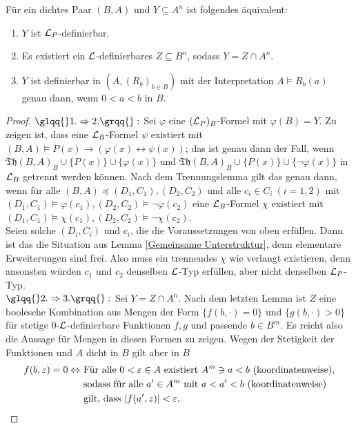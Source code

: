 \begin{theorem}\label{Definierbare Mengen}
	Für ein dichtes Paar $(B,A)$ und $Y\subseteq A^n$ ist folgendes äquivalent:
	\begin{enumerate}
		\item $Y$ ist $\mathcal{L}_P$-definierbar.
		\item Es existiert ein $\mathcal{L}$-definierbares $Z\subseteq B^n$, sodass $Y=Z\cap A^n$.
		\item $Y$ ist definierbar in $(A,(R_b)_{b\in B})$ mit der Interpretation $A\models R_b(a)$ genau dann, wenn $0<a<b$ in $B$.
	\end{enumerate}
\end{theorem}
\newpage
\begin{proof}
	$\glqq{}1.\Rightarrow 2.\grqq{}:$ Sei $\varphi$ eine $(\mathcal{L}_P)_B$-Formel mit $\varphi(B)=Y$. Zu zeigen ist, dass eine $\mathcal{L}_B$-Formel $\psi$ existiert mit $(B,A)\models P(x)\rightarrow(\varphi(x)\leftrightarrow\psi(x))$; das ist genau dann der Fall, wenn $\mathfrak{Th}(B,A)_B\cup\{P(x)\}\cup\{\varphi(x)\}$ und $\mathfrak{Th}(B,A)_B\cup\{P(x)\}\cup\{\neg\varphi(x)\}$ in $\mathcal{L}_B$ getrennt werden können. Nach dem Trennungslemma gilt das genau dann, wenn für alle $(B,A)\preceq(D_1,C_1),(D_2,C_2)$ und alle $c_i\in C_i\ (i=1,2)$ mit $(D_1,C_1)\models\varphi(c_1),(D_2,C_2)\models\neg\varphi(c_2)$ eine $\mathcal{L}_B$-Formel $\chi$ existiert mit $(D_1,C_1)\models\chi(c_1),(D_2,C_2)\models\neg\chi(c_2)$.\\
	Seien solche $(D_i,C_i)$ und $c_i$, die die Voraussetzungen von oben erfüllen. Dann ist das die Situation aus Lemma \ref{Gemeinsame Unterstruktur}, denn elementare Erweiterungen sind frei. Also muss ein trennendes $\chi$ wie verlangt existieren, denn ansonsten würden $c_1$ und $c_2$ denselben $\mathcal{L}$-Typ erfüllen, aber nicht denselben $\mathcal{L}_P$-Typ.\\
	$\glqq{}2.\Rightarrow 3.\grqq{}:$ Sei $Y=Z\cap A^n$. Nach dem letzten Lemma ist $Z$ eine boolesche Kombination aus Mengen der Form $\{f(b,\cdot)=0\}$ und $\{g(b,\cdot)>0\}$ für stetige 0-$\mathcal{L}$-definierbare Funktionen $f,g$ und passende $b\in B^m$. Es reicht also die Aussage für Mengen in diesen Formen zu zeigen. Wegen der Stetigkeit der Funktionen und $A$ dicht in $B$ gilt aber in $B$
	\begin{align*}
	f(b,z)=0\Leftrightarrow\ &\text{Für alle }0<\varepsilon\in A\text{ existiert }A^m\ni a<b\text{ (koordinatenweise),}\\&\text{sodass für alle }a'\in A^m\text{ mit }a<a'<b\text{ (koordinatenweise)}\\&\text{gilt, dass }\abs{f(a',z)}<\varepsilon,\\

\end{align*}
\end{proof}

